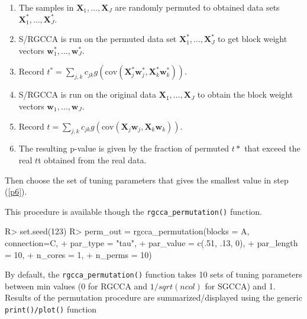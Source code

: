 \documentclass[
]{jss}
\begin{document}
\begin{enumerate}
\item [\label{p1}] The samples in $\mathbf X_1, \ldots, \mathbf X_J$ are
randomly permuted to obtained data sets $\mathbf X_1^*, \ldots, \mathbf X_J^*$.

\item [\label{p2}] S/RGCCA is run on the permuted data set
$\mathbf X_1^*, \ldots, \mathbf X_J^*$ to get block weight vectors
$\mathbf w_1^*, \ldots, \mathbf w_J^*$.

\item [\label{p3}]  Record $t^* = \displaystyle \sum_{j,k} c_{jk} g(\text{cov}(\mathbf X_j^*\mathbf w_j^*, \mathbf X_k^*\mathbf w_k^*))$.

\item [\label{p4}]  S/RGCCA is run on the original data
$\mathbf X_1, \ldots, \mathbf X_J$ to obtain the block weight vectors
$\mathbf w_1, \ldots, \mathbf w_J$.

\item [\label{p5}]  Record $t = \displaystyle \sum_{j,k} c_{jk} g(\text{cov}(\mathbf X_j\mathbf w_j, \mathbf X_k\mathbf w_k))$.

\item [\label{p6}]  The resulting p-value is given by the fraction of permuted
$t*$ that exceed the real $t$t obtained from the real data.
\end{enumerate}

Then choose the set of tuning parameters that gives the smallest value
in step (\ref{p6}).

This procedure is available though the \texttt{rgcca\_permutation()}
function.

\begin{CodeChunk}
\begin{CodeInput}
R> set.seed(123)
R> perm_out = rgcca_permutation(blocks = A, connection=C, 
+                              par_type = "tau",
+                              par_value = c(.51, .13, 0),
+                              par_length = 10,
+                              n_cores = 1,
+                              n_perms = 10)
\end{CodeInput}
\end{CodeChunk}

By default, the \texttt{rgcca\_permutation()} function takes 10 sets of
tuning parameters between min values (0 for RGCCA and \(1/sqrt(ncol)\)
for SGCCA) and 1. Results of the permutation procedure are
summarized/displayed using the generic \texttt{print()/plot()} function
\end{document}
